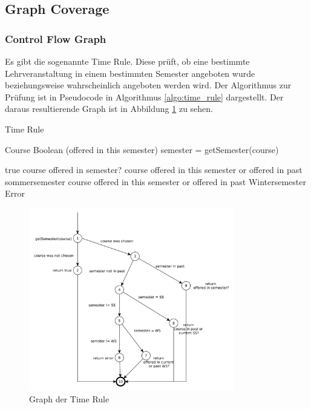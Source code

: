\documentclass[ngerman]{article}
\begin{document}
\subsection{Graph Coverage}

\subsubsection{Control Flow Graph}
Es gibt die sogenannte Time Rule.
Diese prüft, ob eine bestimmte Lehrveranstaltung in einem bestimmten Semester angeboten wurde beziehungsweise wahrscheinlich angeboten werden wird.
Der Algorithmus zur Prüfung ist in Pseudocode in Algorithmus \ref{algo:time_rule} dargestellt. Der daraus resultierende Graph ist in Abbildung \ref{fig:graph_time_rule} zu sehen.

\begin{algorithm}[h!]
\caption{Time Rule}
\label{algo:time_rule}
\begin{algorithmic}[1]
     Course
    \ENSURE Boolean (offered in this semester)
    \STATE semester = getSemester(course)


        \RETURN true
    \ELSE
            \RETURN course offered in semester?
        \ELSE
                \RETURN course offered in this semester or offered in past sommersemester
            \ELSE
                    \RETURN course offered in this semester or offered in past Wintersemester
                \ELSE
                    \RETURN Error
                \ENDIF
            \ENDIF
       \ENDIF
   \ENDIF
\end{algorithmic}
\end{algorithm}


\begin{figure}[h!]
\includegraphics[width=0.8\textwidth]{figures/time_rule.pdf}
\caption{Graph der Time Rule}
\label{fig:graph_time_rule}
\end{figure}
\end{document}
